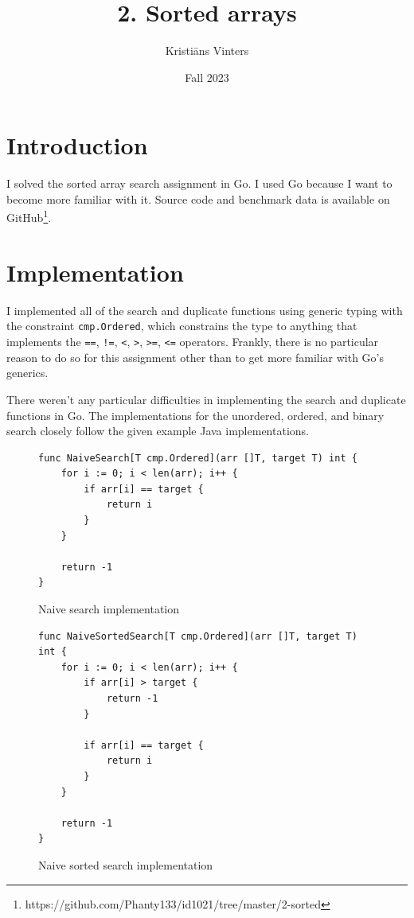 \documentclass[a4paper,11pt]{article}
\title{\textbf{2. Sorted arrays}}
\author{Kristiāns Vinters}
\date{Fall 2023}
\begin{document}
    \maketitle
    \section*{Introduction}

    I solved the sorted array search assignment in Go. I used Go because I want to become more familiar with it. Source code and benchmark data is available on GitHub\footnote{https://github.com/Phanty133/id1021/tree/master/2-sorted}.

    \section*{Implementation}

    I implemented all of the search and duplicate functions using generic typing with the constraint \texttt{cmp.Ordered}, which constrains the type to anything that implements the \texttt{==}, \texttt{!=}, \texttt{<}, \texttt{>}, \texttt{>=}, \texttt{<=} operators. Frankly, there is no particular reason to do so for this assignment other than to get more familiar with Go's generics.

    There weren't any particular difficulties in implementing the search and duplicate functions in Go. The implementations for the unordered, ordered, and binary search closely follow the given example Java implementations.

    \begin{figure}[H]
        \centering
        \begin{verbatim}
func NaiveSearch[T cmp.Ordered](arr []T, target T) int {
    for i := 0; i < len(arr); i++ {
        if arr[i] == target {
            return i
        }
    }

    return -1
}
        \end{verbatim}
        \caption{Naive search implementation}
        \label{fig:naive-search}
    \end{figure}

    \begin{figure}[H]
        \centering
        \begin{verbatim}
func NaiveSortedSearch[T cmp.Ordered](arr []T, target T) int {
    for i := 0; i < len(arr); i++ {
        if arr[i] > target {
            return -1
        }

        if arr[i] == target {
            return i
        }
    }

    return -1
}
        \end{verbatim}
        \caption{Naive sorted search implementation}
        \label{fig:naive-sorted-search}
    \end{figure}
\end{document}
